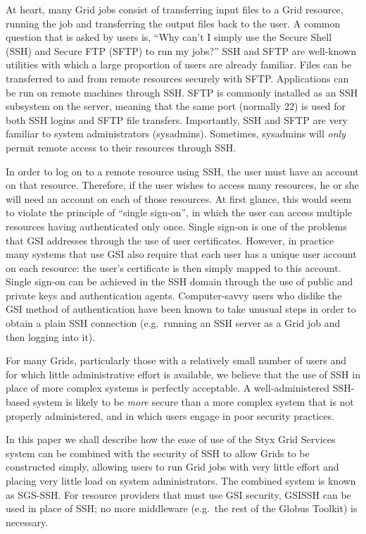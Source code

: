 \documentclass[times,10pt,twocolumn]{article}
\begin{document}
At heart, many Grid jobs consist of transferring input files to a Grid resource, running the job and transferring the output files back to the user.  A common question that is asked by users is, ``Why can't I simply use the Secure Shell (SSH) and Secure FTP (SFTP) to run my jobs?''  SSH and SFTP are 
well-known utilities with which a large proportion of users are already familiar.  Files can be transferred to and from remote resources securely with SFTP.  Applications can be run on remote machines through SSH.  SFTP is commonly installed as an SSH subsystem on the server, meaning that the same port (normally 22) is used for both SSH logins and SFTP file transfers.   Importantly, SSH and SFTP are very familiar to system administrators (sysadmins).  Sometimes, sysadmins will {\em only\/} permit remote access to their resources through SSH.

In order to log on to a remote resource using SSH, the user must have an account on that resource.  Therefore, if the user wishes to access many resources, he or she will need an account on each of those resources.  At first glance, this would seem to violate the principle of ``single sign-on'', in which the user can access multiple resources having authenticated only once.  Single sign-on is one of the problems that GSI addresses through the use of user certificates.  However, in practice many systems that use GSI also require that each user has a unique user account on each resource: the user's certificate is then simply mapped to this account.  Single sign-on can be achieved in the SSH domain through the use of public and private keys and authentication agents.  Computer-savvy users who dislike the GSI method of authentication have been known to take unusual steps in order to obtain a plain SSH connection (e.g.\ running an SSH server as a Grid job and then logging into it).

For many Grids, particularly those with a relatively small number of users and for which little administrative effort is available, we believe that the use of SSH in place of more complex systems is perfectly acceptable.  A well-administered SSH-based system is likely to be {\em more\/} secure than a more complex system that is not properly administered, and in which users engage in poor security practices.

In this paper we shall describe how the ease of use of the Styx Grid Services system can be combined with the security of SSH to allow Grids to be constructed simply, allowing users to run Grid jobs with very little effort and placing very little load on system administrators.  The combined system is known as SGS-SSH.  For resource providers that must use GSI security, GSISSH can be used in place of SSH; no more middleware (e.g.\ the rest of the Globus Toolkit) is necessary.
\end{document}

